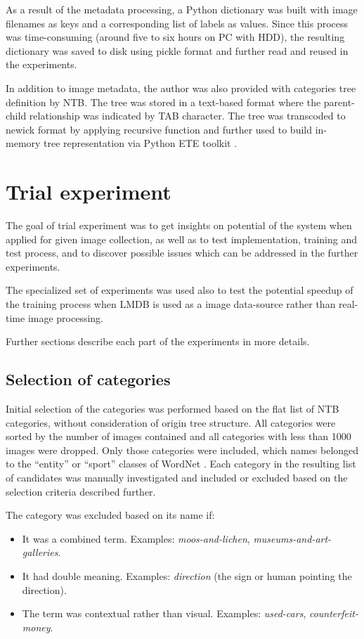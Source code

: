 As a result of the metadata processing, a Python dictionary was built with image filenames as keys and a corresponding list of labels as values. Since this process was time-consuming (around five to six hours on PC with HDD), the resulting dictionary was saved to disk using pickle \cite{pickle} format and further read and reused in the experiments.

In addition to image metadata, the author was also provided with categories tree definition by NTB. The tree was stored in a text-based format where the parent-child relationship was indicated by TAB character. The tree was transcoded to newick \cite{newick} format by applying recursive function and further used to build in-memory tree representation via Python ETE toolkit \cite{ete3}.


\section{Trial experiment}
    The goal of trial experiment was to get insights on potential of the system when applied for given image collection, as well as to test implementation, training and test process, and to discover possible issues which can be addressed in the further experiments.
    
    The specialized set of experiments was used also to test the potential speedup of the training process when LMDB is used as a image data-source rather than real-time image processing.
    
    Further sections describe each part of the experiments in more details.
    
    \subsection{Selection of categories}
    Initial selection of the categories was performed based on the flat list of NTB categories, without consideration of origin tree structure. All categories were sorted by the number of images contained and all categories with less than 1000 images were dropped. Only those categories were included, which names belonged to the ``entity'' or ``sport'' classes of WordNet \cite{wordnet}. Each category in the resulting list of candidates was manually investigated and included or excluded based on the selection criteria described further.
    
    The category was excluded based on its name if:
    \begin{itemize}
        \item It was a combined term. Examples: \textit{moos-and-lichen}, \textit{museums-and-art-galleries}.
        \item It had double meaning. Examples: \textit{direction} (the sign or human pointing the direction).
        \item The term was contextual rather than visual. Examples: \textit{used-cars}, \textit{counterfeit-money}.
    \end{itemize}
    
